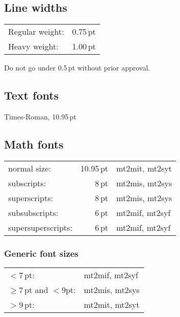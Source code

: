\documentclass{article}
\begin{document}
\subsection{Line widths}

\begin{tabular}{@{}lr@{}}
Regular weight: & 0.75\,pt \\
Heavy weight:   & 1.00\,pt\rlap{ (?)}
\end{tabular}

\bigskip

\noindent
Do not go under 0.5\,pt without prior approval.

\subsection{Text fonts}

Times-Roman, 10.95\,pt

\subsection{Math fonts}

\begin{tabular}{@{}lrl@{}}
normal size:        & 10.95\,pt & mt2mit, mt2syt \\
subscripts:         &     8\,pt & mt2mis, mt2sys \\
superscripts:       &     8\,pt & mt2mis, mt2sys \\
subsubscripts:      &     6\,pt & mt2mif, mt2syf \\
supersuperscripts:  &     6\,pt & mt2mif, mt2syf
\end{tabular}

\subsubsection{Generic font sizes}

\begin{tabular}{@{}ll@{}}
${} <   7\,\mathrm{pt}$:                         & mt2mif, mt2syf \\
${} \ge 7\,\mathrm{pt}$ and ${} < 9\mathrm{pt}$: & mt2mis, mt2sys \\
${} >   9\,\mathrm{pt}$:                         & mt2mit, mt2syt
\end{tabular}
\end{document}
